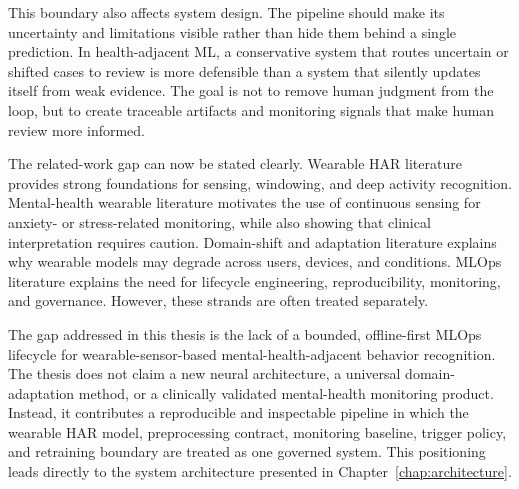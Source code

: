 This boundary also affects system design. The pipeline should make its uncertainty and limitations visible rather than hide them behind a single prediction. In health-adjacent ML, a conservative system that routes uncertain or shifted cases to review is more defensible than a system that silently updates itself from weak evidence. The goal is not to remove human judgment from the loop, but to create traceable artifacts and monitoring signals that make human review more informed.

The related-work gap can now be stated clearly. Wearable HAR literature provides strong foundations for sensing, windowing, and deep activity recognition. Mental-health wearable literature motivates the use of continuous sensing for anxiety- or stress-related monitoring, while also showing that clinical interpretation requires caution. Domain-shift and adaptation literature explains why wearable models may degrade across users, devices, and conditions. MLOps literature explains the need for lifecycle engineering, reproducibility, monitoring, and governance. However, these strands are often treated separately.

The gap addressed in this thesis is the lack of a bounded, offline-first MLOps lifecycle for wearable-sensor-based mental-health-adjacent behavior recognition. The thesis does not claim a new neural architecture, a universal domain-adaptation method, or a clinically validated mental-health monitoring product. Instead, it contributes a reproducible and inspectable pipeline in which the wearable HAR model, preprocessing contract, monitoring baseline, trigger policy, and retraining boundary are treated as one governed system. This positioning leads directly to the system architecture presented in Chapter~\ref{chap:architecture}.

